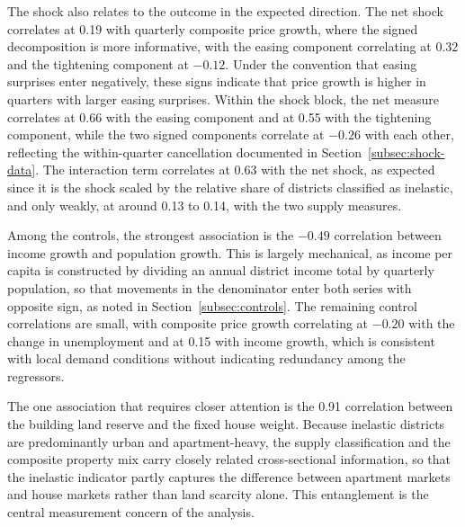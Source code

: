 \documentclass[a4paper,12pt, headsepline]{scrartcl}
\numberwithin{equation}{section}
\begin{document}
The shock also relates to the outcome in the expected direction. The net shock correlates at 0.19 with quarterly composite price growth, where the signed decomposition is more informative, with the easing component correlating at 0.32 and the tightening component at $-0.12$. Under the convention that easing surprises enter negatively, these signs indicate that price growth is higher in quarters with larger easing surprises. Within the shock block, the net measure correlates at 0.66 with the easing component and at 0.55 with the tightening component, while the two signed components correlate at $-0.26$ with each other, reflecting the within-quarter cancellation documented in Section~\ref{subsec:shock-data}. The interaction term correlates at 0.63 with the net shock, as expected since it is the shock scaled by the relative share of districts classified as inelastic, and only weakly, at around 0.13 to 0.14, with the two supply measures.

Among the controls, the strongest association is the $-0.49$ correlation between income growth and population growth. This is largely mechanical, as income per capita is constructed by dividing an annual district income total by quarterly population, so that movements in the denominator enter both series with opposite sign, as noted in Section~\ref{subsec:controls}. The remaining control correlations are small, with composite price growth correlating at $-0.20$ with the change in unemployment and at 0.15 with income growth, which is consistent with local demand conditions without indicating redundancy among the regressors.

The one association that requires closer attention is the 0.91 correlation between the building land reserve and the fixed house weight. Because inelastic districts are predominantly urban and apartment-heavy, the supply classification and the composite property mix carry closely related cross-sectional information, so that the inelastic indicator partly captures the difference between apartment markets and house markets rather than land scarcity alone. This entanglement is the central measurement concern of the analysis.
 
\end{document}
